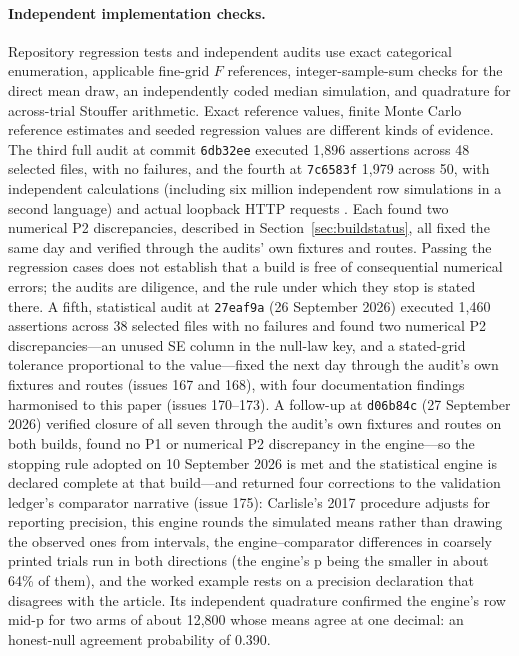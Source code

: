 \documentclass[11pt,a4paper]{article}
\begin{document}
\paragraph{Independent implementation checks.} Repository regression tests and independent audits use exact categorical enumeration, applicable fine-grid $F$ references, integer-sample-sum checks for the direct mean draw, an independently coded median simulation, and quadrature for across-trial Stouffer arithmetic. Exact reference values, finite Monte Carlo reference estimates and seeded regression values are different kinds of evidence. The third full audit at commit \texttt{6db32ee} executed 1,896 assertions across 48 selected files, with no failures, and the fourth at \texttt{7c6583f} 1,979 across 50, with independent calculations (including six million independent row simulations in a second language) and actual loopback HTTP requests \citep{audit2026full,audit2026full2}. Each found two numerical P2 discrepancies, described in Section~\ref{sec:buildstatus}, all fixed the same day and verified through the audits' own fixtures and routes. Passing the regression cases does not establish that a build is free of consequential numerical errors; the audits are diligence, and the rule under which they stop is stated there. A fifth, statistical audit at \texttt{27eaf9a} (26 September 2026) executed 1,460 assertions across 38 selected files with no failures and found two numerical P2 discrepancies---an unused SE column in the null-law key, and a stated-grid tolerance proportional to the value---fixed the next day through the audit's own fixtures and routes (issues 167 and 168), with four documentation findings harmonised to this paper (issues 170--173). A follow-up at \texttt{d06b84c} (27 September 2026) verified closure of all seven through the audit's own fixtures and routes on both builds, found no P1 or numerical P2 discrepancy in the engine---so the stopping rule adopted on 10 September 2026 is met and the statistical engine is declared complete at that build---and returned four corrections to the validation ledger's comparator narrative (issue 175): Carlisle's 2017 procedure adjusts for reporting precision, this engine rounds the simulated means rather than drawing the observed ones from intervals, the engine--comparator differences in coarsely printed trials run in both directions (the engine's p being the smaller in about 64\% of them), and the worked example rests on a precision declaration that disagrees with the article. Its independent quadrature confirmed the engine's row mid-p for two arms of about 12,800 whose means agree at one decimal: an honest-null agreement probability of 0.390.
\end{document}
